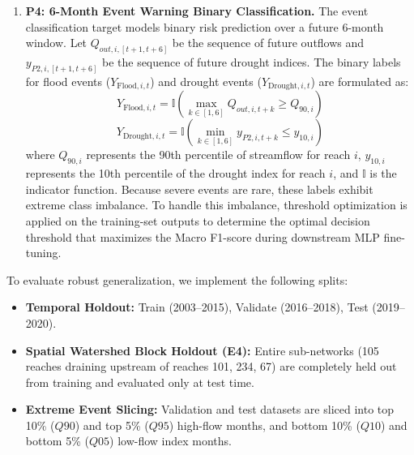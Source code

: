\documentclass[preprint,12pt]{elsarticle}
\begin{document}
\begin{enumerate}
    \item \textbf{P4: 6-Month Event Warning Binary Classification.} The event classification target models binary risk prediction over a future 6-month window. Let $Q_{out, i, [t+1, t+6]}$ be the sequence of future outflows and $y_{P2, i, [t+1, t+6]}$ be the sequence of future drought indices. The binary labels for flood events ($Y_{\text{Flood}, i, t}$) and drought events ($Y_{\text{Drought}, i, t}$) are formulated as:
    \begin{equation}
    Y_{\text{Flood}, i, t} = \mathbb{I}\left( \max_{k \in [1, 6]} Q_{out, i, t+k} \ge Q_{90, i} \right)
    \end{equation}
    \begin{equation}
    Y_{\text{Drought}, i, t} = \mathbb{I}\left( \min_{k \in [1, 6]} y_{P2, i, t+k} \le y_{10, i} \right)
    \end{equation}
    where $Q_{90, i}$ represents the 90th percentile of streamflow for reach $i$, $y_{10, i}$ represents the 10th percentile of the drought index for reach $i$, and $\mathbb{I}$ is the indicator function. Because severe events are rare, these labels exhibit extreme class imbalance. To handle this imbalance, threshold optimization is applied on the training-set outputs to determine the optimal decision threshold that maximizes the Macro F1-score during downstream MLP fine-tuning.
\end{enumerate}

To evaluate robust generalization, we implement the following splits:
\begin{itemize}
    \item \textbf{Temporal Holdout:} Train (2003--2015), Validate (2016--2018), Test (2019--2020).
    \item \textbf{Spatial Watershed Block Holdout (E4):} Entire sub-networks (105 reaches draining upstream of reaches 101, 234, 67) are completely held out from training and evaluated only at test time.
    \item \textbf{Extreme Event Slicing:} Validation and test datasets are sliced into top 10\% ($Q90$) and top 5\% ($Q95$) high-flow months, and bottom 10\% ($Q10$) and bottom 5\% ($Q05$) low-flow index months.
\end{itemize}
\end{document}
